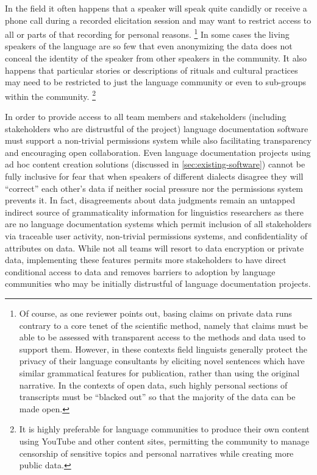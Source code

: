 \documentclass[11pt]{article}
\begin{document}
In the field it often happens that a speaker will speak quite candidly or
receive a phone call  during a recorded elicitation session and may want to
restrict access to all or parts of that recording for personal reasons.%
\footnote{Of course, as one reviewer points out, basing claims on private data
    runs contrary to a core tenet of the scientific method, namely that claims
    must be able to be assessed with transparent access to the methods and data
    used to support them.  However, in these contexts field linguists generally
    protect the privacy of their language consultants by eliciting novel
    sentences which have similar grammatical features for publication, rather
    than using the original narrative. In the contexts of open data, such
    highly personal sections of transcripts must be ``blacked out'' so that the
majority of the data can be made open.} %
In some cases the living speakers of the language are so few that even
anonymizing the data does not conceal the identity of the speaker from other
speakers in the community.  It also happens that particular stories or
descriptions of rituals and cultural practices may need to be restricted to just
the language community or even to sub-groups within the community.%
\footnote{It is highly preferable for language communities to produce
their own content using YouTube and other content sites, permitting the
community to manage censorship of sensitive topics and personal narratives
while creating more public data.}

In order to provide access to all team members and stakeholders (including
stakeholders who are distrustful of the project) language documentation
software must support a non-trivial permissions system while also facilitating
transparency and encouraging open collaboration. Even
language documentation projects using ad hoc content creation solutions
(discussed in \autoref{sec:existing-software}) cannot be fully inclusive for
fear that when speakers of different dialects disagree they will
``correct''  each other's data if neither social pressure nor the permissions system
prevents it. In fact, disagreements about data judgments remain an untapped
indirect source of grammaticality information for linguistics researchers as
there are no language documentation systems which permit inclusion of all
stakeholders via traceable user activity, non-trivial permissions systems, and
confidentiality of attributes on data. While not all teams will resort to data
encryption or private data, implementing these features permits more
stakeholders to have direct conditional access to data and removes barriers to
adoption by language communities who may be initially distrustful of language
documentation projects.%
\end{document}
